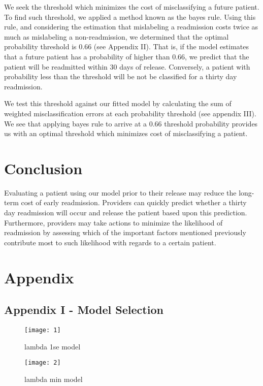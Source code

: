 \documentclass{article}
\begin{document}
We seek the threshold which minimizes the cost of misclassifying a future patient. To find such threshold, we applied a method known as the bayes rule. Using this rule, and considering the estimation that mislabeling a readmission costs twice as much as mislabeling a non-readmission, we determined that the optimal probability threshold is 0.66 (see Appendix II). That is, if the model estimates that a future patient has a probability of higher than 0.66, we predict that the patient will be readmitted within 30 days of release. Conversely, a patient with probability less than the threshold will be not be classified for a thirty day readmission. \newline

We test this threshold against our fitted model by calculating the sum of weighted misclassification errors at each probability threshold (see appendix III). We see that applying bayes rule to arrive at a 0.66 threshold probability provides us with an optimal threshold which minimizes cost of misclassifying a patient.

\section{Conclusion}

Evaluating a patient using our model prior to their release may reduce the long-term cost of early readmission. Providers can quickly predict whether a thirty day readmission will occur and release the patient based upon this prediction. Furthermore, providers may take actions to minimize the likelihood of readmission by assessing which of the important factors mentioned previously contribute most to such likelihood with regards to a certain patient. 

\section{Appendix}
\subsection{Appendix I - Model Selection}


\begin{figure}[h]
\centering
\texttt{[image: 1]}
\caption{lambda 1se model}
\end{figure}

\begin{figure}[h]
\centering
\texttt{[image: 2]}
\caption{lambda min model}
\end{figure}
\end{document}
